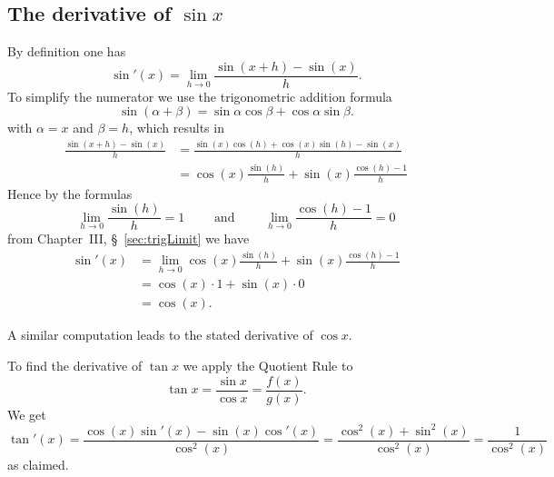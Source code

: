 \subsection{The derivative of $\sin x$} 
\label{sec:deriv-deriv-sin}
By definition one has
\begin{equation}\label{eq:derivation-of-deriv-of-sine}
  \sin'(x)=\lim_{h\to 0}\frac{\sin(x+ h)-\sin(x)}{h} .
\end{equation}
To simplify the numerator we use the trigonometric addition formula
\[
\sin(\alpha+\beta) = \sin\alpha\cos\beta+\cos\alpha\sin\beta.
\]
with $\alpha=x$ and $\beta=h$, which results in
\begin{align*}
  \frac{\sin(x+ h)-\sin(x)}{h} &=
  \frac{\sin(x)\cos(h)+\cos(x)\sin(h)-\sin(x)}{h}\\
  &= \cos(x)\frac{\sin(h)}{h}+\sin(x)\frac{\cos(h)-1}{h}
\end{align*}
Hence by the formulas
\[
\lim_{h\to 0}\frac{\sin(h)}{h} = 1 \qquad\mbox{ and }\qquad
\lim_{h\to 0}\frac{\cos (h)-1}{h} = 0
\]
from Chapter~III, \S~\ref{sec:trigLimit} we have
\begin{align*}
  \sin'(x)
  &= \lim_{h\to 0} \cos(x)\frac{\sin(h)}{h}+\sin(x)\frac{\cos(h)-1}{h}\\
  &= \cos(x) \cdot 1 + \sin(x) \cdot 0\\
  &= \cos(x).
\end{align*}




A similar computation leads to the stated derivative of $\cos x$.




To find the derivative of $\tan x$ we apply the Quotient Rule to
\[
\tan x=\frac{\sin x}{\cos x} = \frac{f(x)}{g(x)}.
\]
We get
\[
\tan'(x)=\frac{\cos(x)\sin'(x) - \sin(x) \cos'(x)}{\cos^2(x)}
=\frac{\cos^2(x)+\sin^2(x)}{\cos^2(x)} =\frac{1}{\cos^2(x)}
\]
as claimed.








